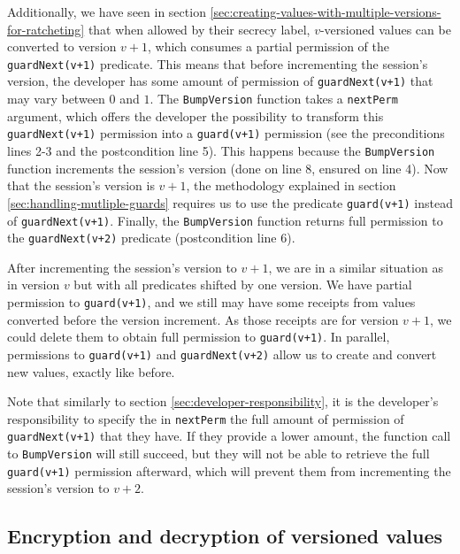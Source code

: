 Additionally, we have seen in section \ref{sec:creating-values-with-multiple-versions-for-ratcheting} that when allowed by their secrecy label, $v$-versioned values can be converted to version $v+1$, which consumes a partial permission of the \texttt{guardNext(v+1)} predicate.
This means that before incrementing the session's version, the developer has some amount of permission of \texttt{guardNext(v+1)} that may vary between $0$ and $1$.
The \texttt{BumpVersion} function takes a \texttt{nextPerm} argument, which offers the developer the possibility to transform this \texttt{guardNext(v+1)} permission into a \texttt{guard(v+1)} permission (see the preconditions lines 2-3 and the postcondition line 5).
This happens because the \texttt{BumpVersion} function increments the session's version (done on line 8, ensured on line 4).
Now that the session's version is $v+1$, the methodology explained in section \ref{sec:handling-mutliple-guards} requires us to use the predicate \texttt{guard(v+1)} instead of \texttt{guardNext(v+1)}.
Finally, the \texttt{BumpVersion} function returns full permission to the \texttt{guardNext(v+2)} predicate (postcondition line 6).

After incrementing the session's version to $v+1$, we are in a similar situation as in version $v$ but with all predicates shifted by one version.
We have partial permission to \texttt{guard(v+1)}, and we still may have some receipts from values converted before the version increment.
As those receipts are for version $v+1$, we could delete them to obtain full permission to \texttt{guard(v+1)}.
In parallel, permissions to \texttt{guard(v+1)} and \texttt{guardNext(v+2)} allow us to create and convert new values, exactly like before.

Note that similarly to section \ref{sec:developer-responsibility}, it is the developer's responsibility to specify the in \texttt{nextPerm} the full amount of permission of \texttt{guardNext(v+1)} that they have. If they provide a lower amount, the function call to \texttt{BumpVersion} will still succeed, but they will not be able to retrieve the full \texttt{guard(v+1)} permission afterward, which will prevent them from incrementing the session's version to $v+2$.

\subsection{Encryption and decryption of versioned values}


